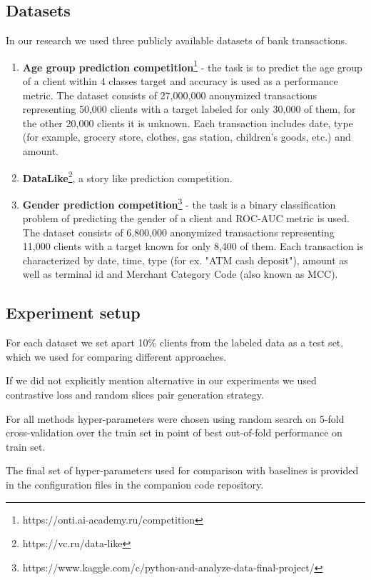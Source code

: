 \documentclass[sigconf]{acmart}
\begin{document}
\subsection{Datasets} \label{sec-datasets}
In our research we used three publicly available datasets of bank transactions.
\begin{enumerate}
    \item \textbf{Age group prediction competition}\footnote{https://onti.ai-academy.ru/competition} - the task is to predict the age group of a client within 4 classes target and accuracy is used as a performance metric.
    The dataset consists of 27,000,000 anonymized transactions representing 50,000 clients with a target labeled for only 30,000 of them, for the other 20,000 clients it is unknown. Each transaction includes date, type (for example, grocery store, clothes, gas station, children's goods, etc.) and amount. 
    
    \item \textbf{DataLike}\footnote{https://vc.ru/data-like}, a story like prediction competition.
        
    \item \textbf{Gender prediction competition}\footnote{https://www.kaggle.com/c/python-and-analyze-data-final-project/} - the task is a binary classification problem of predicting the gender of a client and ROC-AUC metric is used.
    The dataset consists of 6,800,000 anonymized transactions representing 11,000 clients with a target known for only 8,400 of them. Each transaction is characterized by date, time, type (for ex. "ATM cash deposit"), amount as well as terminal id and Merchant Category Code (also known as MCC).
\end{enumerate}

\subsection{Experiment setup}

For each dataset we set apart 10\% clients from the labeled data as a test set, which we used for comparing different approaches.

If we did not explicitly mention alternative in our experiments we used contrastive loss and random slices pair generation strategy.

For all methods hyper-parameters were chosen using random search on 5-fold cross-validation over the train set in point of best out-of-fold performance on train set.


 The final set of hyper-parameters used for comparison with baselines is provided in the configuration files in the companion code repository.
\end{document}
